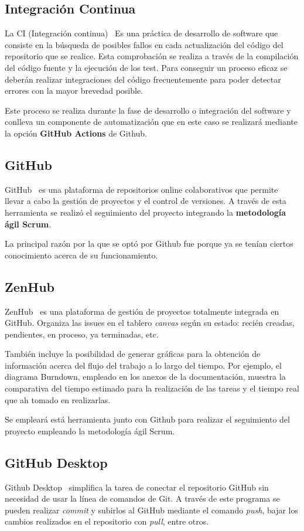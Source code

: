 \subsection{Integración Continua}
La CI (Integración continua)~\cite{pagina_CI} Es una práctica de desarrollo de software que consiste en la búsqueda de posibles fallos en cada actualización del código del repositorio que se realice. Esta comprobación se realiza a través de la compilación del código fuente y la ejecución de los test. Para conseguir un proceso eficaz se deberán realizar integraciones del código frecuentemente para poder detectar errores con la mayor brevedad posible.

Este proceso se realiza durante la fase de desarrollo o integración del software y conlleva un componente de automatización que en este caso se realizará mediante la opción \textbf{GitHub Actions} de Github.

\subsection{GitHub}
GitHub~\cite{pagina_github} es una plataforma de repositorios online colaborativos que permite llevar a cabo la gestión de proyectos y el control de versiones. A través de esta herramienta se realizó el seguimiento del proyecto integrando la \textbf{metodología ágil Scrum}.
 
La principal razón por la que se optó por Github fue porque ya se tenían ciertos conocimiento acerca de su funcionamiento. 

\subsection{ZenHub}
ZenHub~\cite{pagina_zenhub} es una plataforma de gestión de proyectos totalmente integrada en GitHub. Organiza las issues en el tablero \emph{canvas} según su estado: recién creadas, pendientes, en proceso, ya terminadas, etc. 

También incluye la posibilidad de generar gráficas para la obtención de información acerca del flujo del trabajo a lo largo del tiempo. Por ejemplo, el diagrama Burndown, empleado en los anexos de la documentación, muestra la comparativa del tiempo estimado para la realización de las tareas y el tiempo real que ah tomado en realizarlas.

Se empleará está herramienta junto con Github para realizar el seguimiento del proyecto empleando la metodología ágil Scrum.

\subsection{GitHub Desktop}
Github Desktop~\cite{pagina_github_desktop} simplifica la tarea de conectar el repositorio GitHub sin necesidad de usar la línea de comandos de Git. A través de este programa se pueden realizar \emph{commit} y subirlos al GitHub mediante el comando \emph{push}, bajar los cambios realizados en el repositorio con \emph{pull}, entre otros.  
